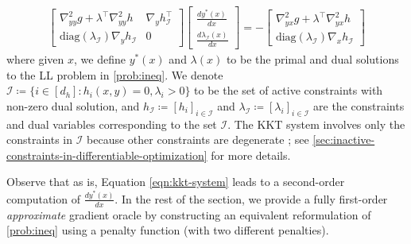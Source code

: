 \begin{align}\label{eqn:kkt-system}
\begin{bmatrix}
\nabla^2_{yy} g + \lambda^\top \nabla_{yy}^2 h & \nabla_y h_\mathcal{I}^\top \\
\text{diag}(\lambda_\mathcal{I}) \nabla_y h_\mathcal{I} & 0
\end{bmatrix}
\begin{bmatrix}
    \frac{d y^*(x)}{d x} \\
    \frac{d \lambda_\mathcal{I}(x)}{d x}
\end{bmatrix}
= 
-
\begin{bmatrix}
    \nabla^2_{yx} g + \lambda^\top \nabla_{yx}^2 h \\
    \text{diag}(\lambda_\mathcal{I}) \nabla_x h_\mathcal{I}
\end{bmatrix}
\end{align}
where given $x$, we define $y^*(x)$ and $\lambda(x)$ to be the primal and dual solutions to the LL problem in \cref{prob:ineq}. We denote $\mathcal{I} \coloneqq \{i \in [d_h]: h_i(x,y) = 0, \lambda_i > 0 \}$ to be the set of active constraints with non-zero dual solution, and
$h_\mathcal{I} \coloneqq [h_i]_{i \in \mathcal{I}}$ and $\lambda_{\mathcal{I}} \coloneqq [\lambda_i]_{i \in \mathcal{I}}$ are the constraints and dual variables corresponding to the set $\mathcal{I}$. 
The KKT system  involves only the constraints in $\mathcal{I}$ because other constraints are degenerate ; see \cref{sec:inactive-constraints-in-differentiable-optimization} for more details. 



Observe that as is, Equation \cref{eqn:kkt-system} leads to a second-order computation of $\frac{dy^*(x)}{dx}$.
In the rest of the section, we provide a fully first-order \emph{approximate} gradient oracle by constructing an equivalent reformulation of \cref{prob:ineq} using a penalty function (with two different penalties).



